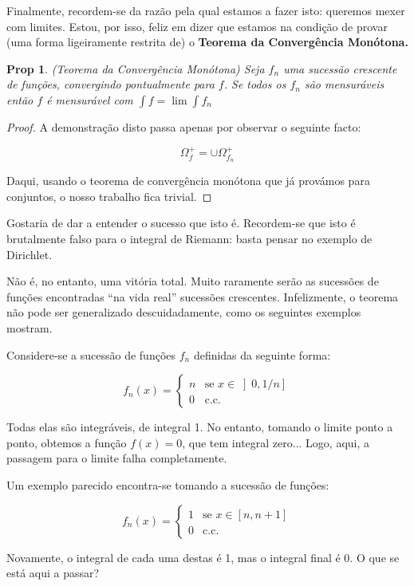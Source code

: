 \documentclass{article}
\newtheorem{prop}{Prop}
\begin{document}
Finalmente, recordem-se da razão pela qual estamos a fazer isto: queremos mexer com limites. Estou, por isso, feliz em dizer que estamos na condição de provar (uma forma ligeiramente restrita de) o \textbf{Teorema da Convergência Monótona.}

\begin{prop}
(Teorema da Convergência Monótona) Seja $f_n$ uma sucessão crescente de funções, convergindo pontualmente para $f$. Se todos os $f_n$ são mensuráveis então $f$ é mensurável com $\int f = \lim \int f_n$
\end{prop}

\begin{proof}
A demonstração disto passa apenas por observar o seguinte facto:

\[\Omega^+_f = \cup \Omega^+_{f_n}\]

Daqui, usando o teorema de convergência monótona que já provámos para conjuntos, o nosso trabalho fica trivial.
\end{proof}

Gostaria de dar a entender o sucesso que isto é. Recordem-se que isto é brutalmente falso para o integral de Riemann: basta pensar no exemplo de Dirichlet.

Não é, no entanto, uma vitória total. Muito raramente serão as sucessões de funções encontradas ``na vida real'' sucessões crescentes. Infelizmente, o teorema não pode ser generalizado descuidadamente, como os seguintes exemplos mostram.

Considere-se a sucessão de funções $f_n$ definidas da seguinte forma:

\[ f_n(x) =
\begin{cases}
n & \text{se } x \in \left]0, 1/n\right] \\
0 & \text{c.c.}
\end{cases}
\]

Todas elas são integráveis, de integral 1. No entanto, tomando o limite ponto a ponto, obtemos a função $f(x) = 0$, que tem integral zero... Logo, aqui, a passagem para o limite falha completamente.

Um exemplo parecido encontra-se tomando a sucessão de funções:


\[ f_n(x) =
\begin{cases}
1 & \text{se } x \in [n, n+1] \\
0 & \text{c.c.}
\end{cases}
\]

Novamente, o integral de cada uma destas é 1, mas o integral final é 0. O que se está aqui a passar?
\end{document}
